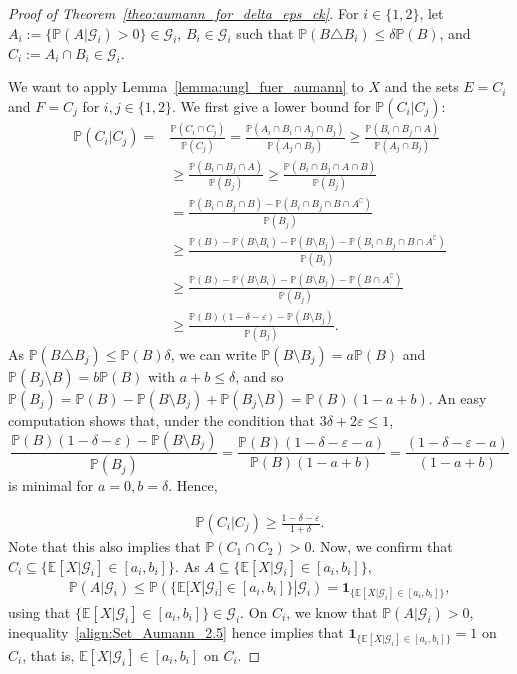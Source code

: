 \documentclass[a4paper, 10pt]{article}
\numberwithin{theorem}{section}
\theoremstyle{definition}
\newcommand{\E}{\mathbb{E}}
\newcommand{\G}{\mathcal{G}}
\newcommand{\ind}[1]{\mathbf{1}_{#1}}
\renewcommand{\epsilon}{\varepsilon}
\renewcommand{\P}{\mathbb{P}}
\begin{document}
\begin{proof}[Proof of Theorem~\ref{theo:aumann_for_delta_eps_ck}]
	For $i\in \{1,2\}$, let $A_i:= \{\P(A|\G_i) > 0\} \in \G_i$, $B_i \in \G_i$ such that $\P(B \triangle B_i) \leq \delta \P(B)$, and $ C_i:=A_i\cap B_i \in \G_i$. 
	
	
	We want to apply Lemma~\ref{lemma:ungl_fuer_aumann}  to $X$ and the sets $E=C_i$ and $F=C_j$ for $i,j\in \{1,2\}$. We first give a lower bound for $\P(C_i|C_j)$:
	\begin{align*}
		\P(C_i|C_j) = & \frac{\P(C_i \cap C_j)}{\P(C_j)} = \frac{\P(A_i \cap B_i \cap A_j \cap B_j)}{\P(A_j \cap B_j)} \geq \frac{\P(B_i \cap B_j \cap A)}{\P(A_j \cap B_j)}\\
		&\geq \frac{\P(B_i\cap B_j \cap A)}{\P(B_j)} \geq  \frac{\P(B_i\cap B_j \cap A \cap B)}{\P(B_j)} \\ 
		&= \frac{\P(B_i\cap B_j \cap B) - \P(B_i \cap B_j \cap B \cap A^{\complement} )}{\P(B_j)} \\
		& \geq \frac{\P(B) - \P(B\setminus B_i) - \P(B\setminus B_j)- \P(B_i \cap B_j \cap B \cap A^{\complement} )}{\P(B_j)} \\
		& \geq \frac{\P(B) - \P(B\setminus B_i) - \P(B\setminus B_j)- \P( B \cap A^{\complement})}{\P(B_j)} \\
		&\geq \frac{\P(B) (1-\delta-\epsilon) - \P(B\setminus B_j)}{\P(B_j)}.
	\end{align*}
As $\P(B \triangle B_j) \leq \P(B) \delta$, we can  write $\P(B\setminus B_j) = a \P(B)$ and $\P(B_j\setminus B)=b \P(B)$ with $a+b \leq \delta$, and so  $\P(B_j)=\P(B) - \P(B\setminus B_j) + \P(B_j \setminus B) = \P(B) (1-a+b)$. An easy computation shows that, under the condition that $3\delta + 2 \epsilon \leq 1$,
	$$\frac{\P(B) (1-\delta-\epsilon) - \P(B\setminus B_j)}{\P(B_j)}=\frac{\P(B) (1-\delta-\epsilon-a)}{\P(B)(1-a+b)} =\frac{ (1-\delta-\epsilon-a)}{(1-a+b)}$$
	is minimal for $a=0, b=\delta$. Hence,
	

	\begin{align}\label{align:Set_Aumann_2}
	\P(C_i|C_j) \geq \frac{ 1-\delta-\epsilon }{1+\delta}.
	\end{align} 
	Note that this also implies that $\P(C_1 \cap C_2)>0$.
	Now, we confirm that $C_i \subseteq \{\E[X|\G_i] \in [a_i,b_i] \}$. As $A \subseteq  \{\E[X|\G_i] \in [a_i,b_i] \}$,
	\begin{align}\label{align:Set_Aumann_2.5}
	 \P(A|\G_i) \leq \P( \{\E[X|\G_i] \in [a_i,b_i] \}|\G_i) = \ind{ \{\E[X|\G_i] \in [a_i,b_i] \}},
	 \end{align}
	using that $ \{\E[X|\G_i] \in [a_i,b_i] \} \in \G_i$. On $C_i$, we know that $\P(A|\G_i) > 0$, inequality~\eqref{align:Set_Aumann_2.5} hence implies that $ \ind{\{\E[X|\G_i] \in [a_i,b_i] \}}=1$ on $C_i$, that is, $ \E[X|\G_i] \in [a_i,b_i]$ on $C_i$.
	

\end{proof}
\end{document}
